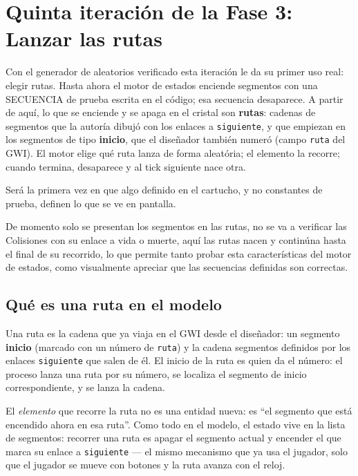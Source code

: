 \section{Quinta iteración de la Fase 3: Lanzar las rutas}
\label{sec:LanzarRutas}

	
	Con el generador de aleatorios verificado esta iteración le da
	su primer uso real: elegir rutas. Hasta ahora el motor de estados
	enciende segmentos con una SECUENCIA de prueba escrita en el código;
	esa secuencia desaparece. A partir de aquí, lo que se enciende y se
	apaga en el cristal son \textbf{rutas}: cadenas de segmentos que la
	autoría dibujó con los enlaces a \texttt{siguiente}, y que empiezan en
	los segmentos de tipo \textbf{inicio}, que el diseñador también numeró
	(campo \texttt{ruta} del GWI). El motor elige qué ruta lanza de forma 
	aleatória; el elemento la recorre; cuando termina, desaparece y al tick 
	siguiente nace otra.
	
	Será la primera vez en que algo definido en el cartucho, y no constantes de
	prueba, definen lo que se ve en pantalla. 
	
	De momento solo se presentan los segmentos en las rutas, no se va a verificar las Colisiones con su enlace a vida o muerte, aquí las rutas nacen y continúna hasta el final de su recorrido, lo que permite tanto probar esta características del motor de estados, como visualmente apreciar que las secuencias definidas son correctas.	
	
	\subsection{Qué es una ruta en el modelo}
	
	Una ruta es la cadena que ya viaja en el GWI desde el diseñador:
	un segmento \textbf{inicio} (marcado con un número de \texttt{ruta}) y la
	cadena segmentos definidos por los enlaces \texttt{siguiente} que salen de él. El inicio de la	ruta es quien da el número: el proceso lanza una ruta por su número, se localiza el segmento de inicio correspondiente, y se lanza la cadena.
	
	El \emph{elemento} que recorre la ruta no es una entidad nueva:
	es ``el segmento que está encendido ahora en esa ruta''. Como todo
	en el modelo, el estado vive en la lista de segmentos: recorrer una
	ruta es apagar el segmento actual y encender el que marca su enlace a
	\texttt{siguiente} — el mismo mecanismo que ya usa el jugador, solo
	que el jugador se mueve con botones y la ruta avanza con el reloj.
	
